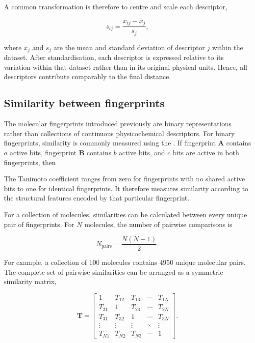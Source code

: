 A common transformation is therefore to centre and scale each descriptor,

  \begin{equation}
    z_{ij}
    =
    \frac{x_{ij}-\bar{x}_j}{s_j},
  \end{equation}

where $\bar{x}_j$ and $s_j$ are the mean and standard deviation of descriptor $j$ within the dataset.
After standardisation, each descriptor is expressed relative to its variation within that dataset rather than in its original physical units.
Hence, all descriptors contribute comparably to the final distance.

\subsection{Similarity between fingerprints}

The molecular fingerprints introduced previously are binary representations rather than collections of continuous physicochemical descriptors.
For binary fingerprints, similarity is commonly measured using the .
If fingerprint \textbf{A} contains $a$ active bits, fingerprint \textbf{B} contains $b$ active bits, and $c$ bits are active in both fingerprints, then


The Tanimoto coefficient ranges from zero for fingerprints with no shared active bits to one for identical fingerprints.
It therefore measures similarity according to the structural features encoded by that particular fingerprint.

For a collection of molecules, similarities can be calculated between every unique pair of fingerprints.
For $N$ molecules, the number of pairwise comparisons is

  \begin{equation}
    N_{\mathrm{pairs}}
    =
    \frac{N(N-1)}{2}.
  \end{equation}

For example, a collection of 100 molecules contains 4950 unique molecular pairs.
The complete set of pairwise similarities can be arranged as a symmetric similarity matrix,

  \begin{equation}
    \mathbf{T}
    =
    \begin{bmatrix}
      1 & T_{12} & T_{13} & \cdots & T_{1N} \\
      T_{21} & 1 & T_{23} & \cdots & T_{2N} \\
      T_{31} & T_{32} & 1 & \cdots & T_{3N} \\
      \vdots & \vdots & \vdots & \ddots & \vdots \\
      T_{N1} & T_{N2} & T_{N3} & \cdots & 1
    \end{bmatrix}.
  \end{equation}

